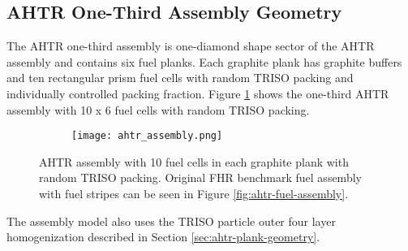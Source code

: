 \subsection{AHTR One-Third Assembly Geometry}
The \gls{AHTR} one-third assembly is one-diamond shape sector of the \gls{AHTR} assembly and
contains six fuel planks.
Each graphite plank has graphite buffers and ten rectangular prism fuel cells 
with random TRISO packing and individually controlled packing fraction. 
Figure \ref{fig:ahtr_assembly} shows the one-third \gls{AHTR} assembly with 10 x 6 fuel cells with 
random \gls{TRISO} packing.
\begin{figure}[]
    \centering
    \begin{subfigure}{.7\textwidth}
    \texttt{[image: ahtr\_assembly.png]}
    \end{subfigure}%
    \begin{subfigure}{.3\textwidth}
        \vspace{1cm}
    \end{subfigure}
    \caption{\gls{AHTR} assembly with 10 fuel cells in each graphite plank with random 
    TRISO packing. Original \gls{FHR} benchmark fuel assembly with fuel stripes can be seen in 
    Figure \ref{fig:ahtr-fuel-assembly}.}
    \label{fig:ahtr_assembly}
\end{figure}
The assembly model also uses the \gls{TRISO} particle outer four layer homogenization described 
in Section \ref{sec:ahtr-plank-geometry}.



